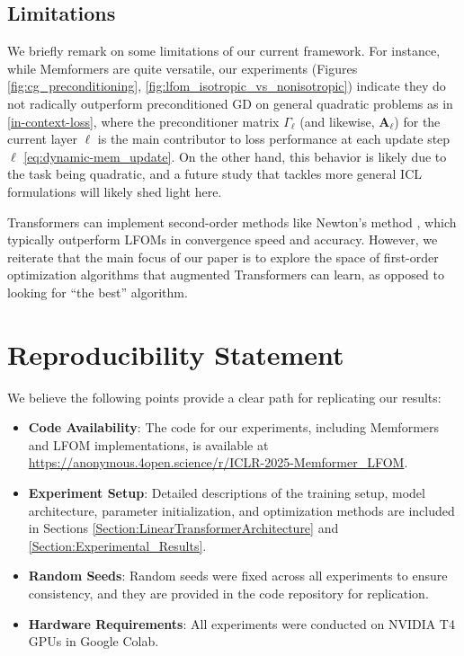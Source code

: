\documentclass[11pt]{article}
\numberwithin{equation}{section}
\begin{document}
\subsection{Limitations}
We briefly remark on some limitations of our current framework. %
For instance, while Memformers are quite versatile, our experiments (Figures \ref{fig:cg_preconditioning}, \ref{fig:lfom_isotropic_vs_nonisotropic}) indicate they do not radically outperform preconditioned GD on general quadratic problems as in \eqref{in-context-loss}, where the preconditioner matrix \(\Gamma_\ell\) (and likewise, \(\mathbf A_\ell\)) for the current layer \(\ell\) is the main contributor to loss performance at each update step \(\ell\) \eqref{eq:dynamic-mem_update}. On the other hand, this behavior is likely due to the task being quadratic, and a future study that tackles more general ICL formulations will likely shed light here.

Transformers can implement second-order methods like Newton's method \citep{fu2023transformers, giannou2024well}, which typically outperform LFOMs in convergence speed and accuracy. However, we reiterate that the main focus of our paper is to explore the space of first-order optimization algorithms that augmented Transformers can learn, as opposed to looking for ``the best'' algorithm.


\section{Reproducibility Statement}

We believe the following points provide a clear path for replicating our results:

\begin{itemize}
    \item \textbf{Code Availability}: The code for our experiments, including Memformers and LFOM implementations, is available at \url{https://anonymous.4open.science/r/ICLR-2025-Memformer_LFOM}.
    
    \item \textbf{Experiment Setup}: Detailed descriptions of the training setup, model architecture, parameter initialization, and optimization methods are included in Sections \ref{Section:LinearTransformerArchitecture} and \ref{Section:Experimental_Results}.
    
    \item \textbf{Random Seeds}: Random seeds were fixed across all experiments to ensure consistency, and they are provided in the code repository for replication.
    
    \item \textbf{Hardware Requirements}: All experiments were conducted on NVIDIA T4 GPUs in Google Colab.
\end{itemize}
\end{document}
